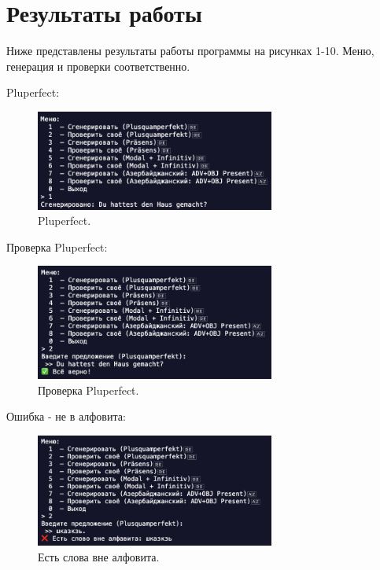 \documentclass[areasetadvanced]{scrartcl}
\begin{document}
\newpage
\section{Результаты работы}
Ниже представлены результаты работы программы на рисунках 1-10. Меню, генерация и проверки соответственно.

Pluperfect:
\begin{figure}[H]
	\centering
	\includegraphics[width=0.7\textwidth]{images/pqRight.png}
	\caption{Pluperfect.}
	\label{fig:syntdiag}
\end{figure}

Проверка Pluperfect:
\begin{figure}[H]
	\centering
	\includegraphics[width=0.7\textwidth]{images/pqCorrect.png}
	\caption{Проверка Pluperfect.}
	\label{fig:syntdiag}
\end{figure}

Ошибка - не в алфовита:
\begin{figure}[H]
	\centering
	\includegraphics[width=0.7\textwidth]{images/notAlpabit.png}
	\caption{Есть слова вне алфовита.}
	\label{fig:syntdiag}
\end{figure}
\end{document}
